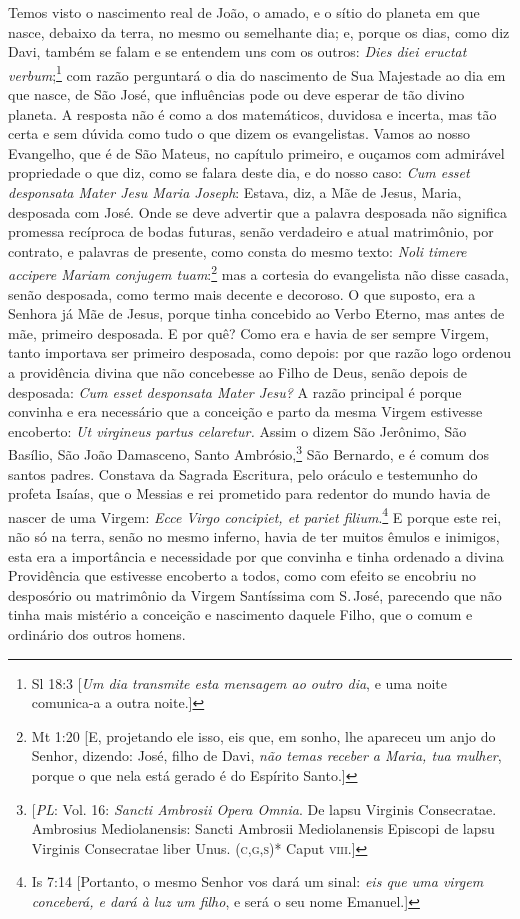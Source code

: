 Temos visto o nascimento real de João, o amado, e o sítio do planeta em
que nasce, debaixo da terra, no mesmo ou semelhante dia; e, porque os
dias, como diz Davi, também se falam e se entendem uns com os outros:
\emph{Dies diei eructat verbum};\footnote{Sl 18:3 [\textit{Um dia transmite esta mensagem ao outro dia}, e uma noite comunica-a a outra noite.]} com razão perguntará o dia do
nascimento de Sua Majestade ao dia em que nasce, de São José, que
influências pode ou deve esperar de tão divino planeta. A resposta não é
como a dos matemáticos, duvidosa e incerta, mas tão certa e sem dúvida
como tudo o que dizem os evangelistas. Vamos ao nosso Evangelho, que é
de São Mateus, no capítulo primeiro, e ouçamos com admirável propriedade
o que diz, como se falara deste dia, e do nosso caso: \emph{Cum esset
desponsata Mater Jesu Maria Joseph}: Estava, diz, a Mãe de
Jesus, Maria, desposada com José. Onde se deve advertir que a palavra
desposada não significa promessa recíproca de bodas futuras, senão
verdadeiro e atual matrimônio, por contrato, e palavras de presente,
como consta do mesmo texto: \emph{Noli timere accipere Mariam conjugem
tuam}:\footnote{Mt 1:20 [E, projetando ele isso, eis que, em sonho, lhe apareceu um anjo do Senhor, dizendo: José, filho de Davi, \textit{não temas receber a Maria, tua mulher}, porque o que nela está gerado é do Espírito Santo.]} mas a cortesia do evangelista não disse casada, senão
desposada, como termo mais decente e decoroso. O que suposto, era a
Senhora já Mãe de Jesus, porque tinha concebido ao Verbo Eterno, mas
antes de mãe, primeiro desposada. E por quê? Como era e havia de ser
sempre Virgem, tanto importava ser primeiro desposada, como depois: por
que razão logo ordenou a providência divina que não concebesse ao Filho
de Deus, senão depois de desposada: \emph{Cum esset desponsata Mater
Jesu?} A razão principal é porque convinha e era necessário que a
conceição e parto da mesma Virgem estivesse encoberto: \emph{Ut
virgineus partus celaretur.} Assim o dizem São Jerônimo, São Basílio,
São João Damasceno, Santo Ambrósio,\footnote{[\textit{PL}: Vol. 16: \textit{Sancti Ambrosii Opera Omnia}. De lapsu Virginis Consecratae. Ambrosius Mediolanensis: Sancti Ambrosii Mediolanensis Episcopi de lapsu Virginis Consecratae liber Unus. (\textsc{c,g,s})* Caput \textsc{viii}.]} São Bernardo, e é comum dos santos
padres. Constava da Sagrada Escritura, pelo oráculo e testemunho do
profeta Isaías, que o Messias e rei prometido para redentor do mundo
havia de nascer de uma Virgem: \emph{Ecce Virgo concipiet, et pariet
filium}.\footnote{Is 7:14 [Portanto, o mesmo Senhor vos dará um sinal: \textit{eis que uma virgem conceberá, e dará à luz um filho}, e será o seu nome Emanuel.]} E porque este rei, não só na terra, senão no mesmo
inferno, havia de ter muitos êmulos e inimigos, esta era a importância e
necessidade por que convinha e tinha ordenado a divina Providência que
estivesse encoberto a todos, como com efeito se encobriu no desposório
ou matrimônio da Virgem Santíssima com S.\,José, parecendo que não tinha
mais mistério a conceição e nascimento daquele Filho, que o comum e
ordinário dos outros homens.


